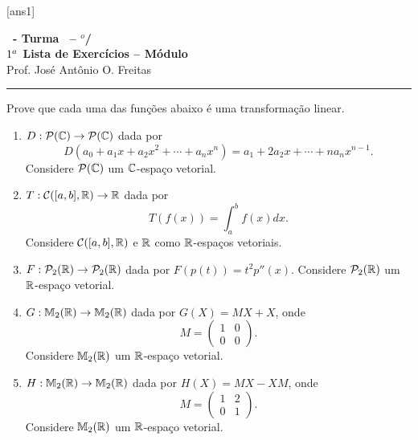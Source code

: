 \documentclass[12pt]{exam}
\begin{document}
  [ans1]
  \begin{center}
    {\Large\bf \disciplina\ - Turma \turma\ -- \semestre$^{o}$/\ano} \\ \vspace{9pt} {\large\bf
        $1^a$ Lista de Exercícios -- Módulo \numeromodulo}\\ \vspace{9pt} Prof. José Antônio O. Freitas
  \end{center}
  \hrule


\begin{exercicio}
    Prove que cada uma das funções abaixo é uma transformação linear.
    \begin{enumerate}[label={\alph*})]
        \item $D : \mathcal{P}(\mathbb{C}) \to \mathcal{P}(\mathbb{C})$ dada por
        \[
            D(a_0 + a_1x + a_2x^2 + \cdots + a_nx^n) = a_1 + 2a_2x + \cdots + na_nx^{n - 1}.
        \]
        Considere $\mathcal{P}(\mathbb{C})$ um $\mathbb{C}$-espaço vetorial.

        \item $T : \mathcal{C}([a,b], \mathbb{R}) \to \mathbb{R}$ dada por
        \[
            T(f(x)) = \int_a^bf(x)dx.
        \]
        Considere $\mathcal{C}([a,b], \mathbb{R})$ e $\mathbb{R}$ como $\mathbb{R}$-espaços vetoriais.

        \item $F : \mathcal{P}_2(\mathbb{R}) \to \mathcal{P}_2(\mathbb{R})$ dada por $F(p(t)) = t^2p''(x)$. Considere $\mathcal{P}_2(\mathbb{R})$ um $\mathbb{R}$-espaço vetorial.

        \item $G : \mathbb{M}_2(\mathbb{R}) \to \mathbb{M}_2(\mathbb{R})$ dada por $G(X) = MX + X$, onde
        \[
            M = \begin{pmatrix}
                    1 & 0\\
                    0 & 0
                \end{pmatrix}.
        \]
        Considere $\mathbb{M}_2(\mathbb{R})$ um $\mathbb{R}$-espaço vetorial.

        \item $H : \mathbb{M}_2(\mathbb{R}) \to \mathbb{M}_2(\mathbb{R})$ dada por $H(X) = MX - XM$, onde
        \[
            M = \begin{pmatrix}
                    1 & 2\\
                    0 & 1
                \end{pmatrix}.
        \]
        Considere $\mathbb{M}_2(\mathbb{R})$ um $\mathbb{R}$-espaço vetorial.


\end{enumerate}
\end{exercicio}
\end{document}
